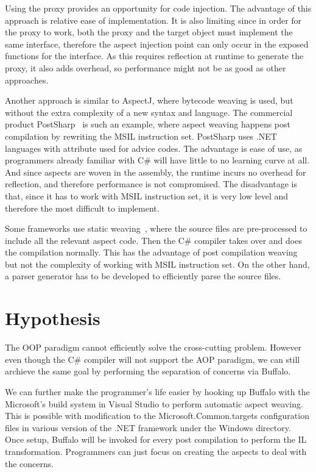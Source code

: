 Using the proxy provides an opportunity for code injection. The advantage of this approach is relative ease of implementation. It is also limiting since in order for the proxy to work, both the proxy and the target object must implement the same interface, therefore the aspect injection point can only occur in the exposed functions for the interface. As this requires reflection at runtime to generate the proxy, it also adds overhead, so performance might not be as good as other approaches.

Another approach is similar to AspectJ, where bytecode weaving is used, but without the extra complexity of a new syntax and language. The commercial product PostSharp~\cite{postsharp} is such an example, where aspect weaving happens post compilation by rewriting the MSIL instruction set. PostSharp uses .NET languages with attribute used for advice codes. The advantage is ease of use, as programmers already familiar with C\# will have little to no learning curve at all. And since aspects are woven in the assembly, the runtime incurs no overhead for reflection, and therefore performance is not compromised. The disadvantage is that, since it has to work with MSIL instruction set, it is very low level and therefore the most difficult to implement.

Some frameworks use static weaving~\cite{aspectcs}, where the source files are pre-processed to include all the relevant aspect code. Then the C\# compiler takes over and does the compilation normally. This has the advantage of post compilation weaving but not the complexity of working with MSIL instruction set. On the other hand, a parser generator has to be developed to efficiently parse the source files.

\section{Hypothesis}
The OOP paradigm cannot efficiently solve the cross-cutting problem. However even though the C\# compiler will not support the AOP paradigm, we can still archieve the same goal by performing the separation of concerns via Buffalo.

We can further make the programmer's life easier by hooking up Buffalo with the Microsoft's build system in Visual Studio to perform automatic aspect weaving. This is possible with modification to the Microsoft.Common.targets configuration files in various version of the .NET framework under the Windows directory. Once setup, Buffalo will be invoked for every post compilation to perform the IL transformation. Programmers can just focus on creating the aspects to deal with the concerns.

